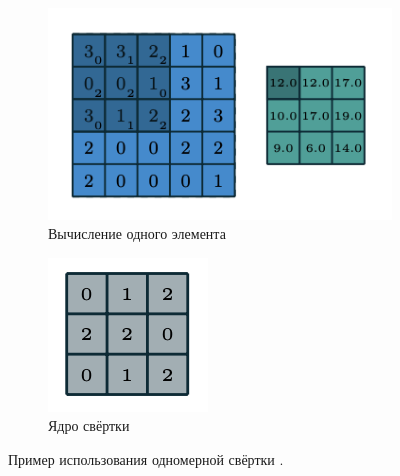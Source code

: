 \documentclass[12pt, fleqn]{article}
\begin{document}
    \begin{figure}[ht]
        \centering
        \begin{subfigure}[b]{0.5\textwidth}
            \includegraphics[width=\linewidth]{pics/2d_conv.png}
            \caption{Вычисление одного элемента}
        \end{subfigure}
        \begin{subfigure}[b]{0.2\textwidth}
            \includegraphics[width=\linewidth]{pics/2d_kernel.png}
            \caption{Ядро свёртки}
        \end{subfigure}
        \caption{Пример использования одномерной свёртки \cite{dumoulin2016guide}.}
        \label{2d_conv}
    \end{figure}
\end{document}
